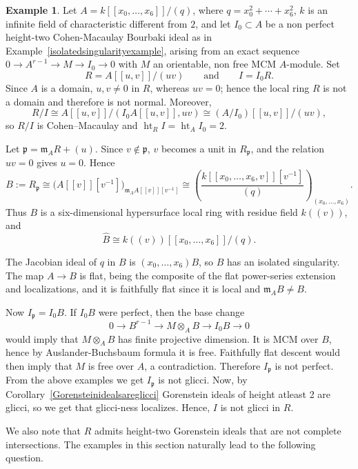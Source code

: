 \documentclass[11pt,letterpaper]{amsart}
\newcommand{\x}{\xrightarrow{}}
\theoremstyle{plain}
\theoremstyle{definition}
\newtheorem{ex}[thm]{Example}
\theoremstyle{remark}
\begin{document}
\begin{ex}
Let \(A=k[[x_0,\ldots,x_6]]/(q)\), where \(q=x_0^2+\cdots+x_6^2\), \(k\) is an infinite field of characteristic different from \(2\), and let \(I_0\subset A\) be a non perfect height-two Cohen-Macaulay Bourbaki ideal as in Example~\ref{isolatedsingularityexample}, arising from an exact sequence \(0\x A^{r-1}\x M\x I_0\x0\) with \(M\) an orientable, non free MCM \(A\)-module. Set
\[
R=A[[u,v]]/(uv)\qquad\text{and}\qquad I=I_0R.
\]
Since \(A\) is a domain, \(u,v\neq0\) in \(R\), whereas \(uv=0\); hence the local ring \(R\) is not a domain and therefore is not normal. Moreover,
\[
R/I\cong A[[u,v]]/(I_0A[[u,v]],uv)\cong (A/I_0)[[u,v]]/(uv),
\]
so \(R/I\) is Cohen--Macaulay and \(\operatorname{ht}_R I=\operatorname{ht}_A I_0=2\).

Let \(\mathfrak p=\mathfrak m_AR+(u)\). Since \(v\notin\mathfrak p\), \(v\) becomes a unit in \(R_{\mathfrak p}\), and the relation \(uv=0\) gives \(u=0\). Hence
\[
B:=R_{\mathfrak p}\cong\bigl(A[[v]][v^{-1}]\bigr)_{\mathfrak m_AA[[v]][v^{-1}]}
 \cong\left(\frac{k[[x_0,\ldots,x_6,v]][v^{-1}]}{(q)}\right)_{(x_0,\ldots,x_6)}.
\]
Thus \(B\) is a six-dimensional hypersurface local ring with residue field \(k((v))\), and
\[
\widehat B\cong k((v))[[x_0,\ldots,x_6]]/(q).
\]

The Jacobian ideal of \(q\) in \(B\) is \((x_0,\ldots,x_6)B\), so \(B\) has an isolated singularity. The map \(A\to B\) is flat, being the composite of the flat power-series extension and localizations, and it is faithfully flat since it is local and \(\mathfrak m_AB\neq B\).

Now \(I_{\mathfrak p}=I_0B\). If \(I_0B\) were perfect, then the base change
\[
0\longrightarrow B^{r-1}\longrightarrow M\otimes_AB\longrightarrow I_0B\longrightarrow0
\]
would imply that \(M\otimes_AB\) has finite projective dimension. It is MCM over \(B\), hence by Auslander-Buchsbaum formula it is free. Faithfully flat descent would then imply that \(M\) is free over \(A\), a contradiction. Therefore \(I_{\mathfrak p}\) is not perfect. From the above examples we get $I_\mathfrak p$ is not glicci. Now, by Corollary~\ref{Gorensteinidealsareglicci} Gorenstein ideals of height atleast 2 are glicci, so we get that glicci-ness localizes. Hence, \(I\) is not glicci in \(R\).
\end{ex}

We also note that \(R\) admits height-two Gorenstein ideals that are not complete intersections. The examples in this section naturally lead to the following
question.
\end{document}

